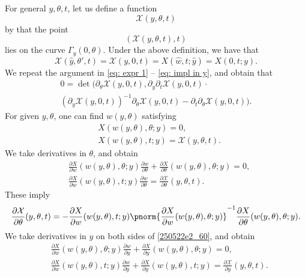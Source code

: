 \documentclass{article}
\numberwithin{equation}{section}
\theoremstyle{plain}
\begin{document}
For general $y, \theta, t$, let us define a function 
\begin{equation}
\mathcal{X}(y, \theta, t)
\end{equation}
by that the point
\begin{equation}
(\mathcal{X}(y, \theta, t), t)
\end{equation}
lies on the curve $\Gamma_y(0, \theta)$. 
 Under the above definition, we have that 
\begin{equation}
\mathcal{X}(\hat{y}, \theta', t)= \mathcal{X}(y, 0, t)= X(
\hat{w}, t; \hat{y}
)=X(0, t; y).
\end{equation}
We repeat the argument in \eqref{eq: expr 1} -- \eqref{eq: impl in y}, and obtain that 
\begin{multline}\label{250522e2_59tt}
    0= 
    \det(\partial_\theta \mathcal{X}(y, 0, t), \partial_y \partial_t \mathcal{X}(y, 0, t) \cdot\\
     (\partial_y \mathcal{X}(y, 0, t))^{-1} \partial_\theta \mathcal{X}(y, 0, t) - \partial_t \partial_\theta \mathcal{X}(y, 0, t)).
\end{multline}
For given $y, \theta$, one can find $w(y, \theta)$ satisfying 
\begin{align}\label{250522e2_60}
& X(w(y, \theta), \theta; y)=0,\\
& X(w(y, \theta), t; y)= \mathcal{X}(y, \theta, t).
\end{align}
We take derivatives in $\theta$, and obtain 
\begin{align}\label{250522e2_62}
& \frac{\partial X}{\partial w}(w(y, \theta), \theta; y)
\frac{\partial w}{\partial \theta}+ \frac{\partial X}{\partial \theta}(w(y, \theta), \theta; y)
=0,\\
& \frac{\partial X}{\partial w}(w(y, \theta), t; y)\frac{\partial w}{\partial \theta}= \frac{\partial \mathcal{X}}{\partial \theta}(y, \theta, t).
\end{align}
These imply 
\begin{equation}\label{250522e2_64}
\frac{\partial \mathcal{X}}{\partial \theta}(y, \theta, t)=
-
\frac{\partial X}{\partial w}(w(y, \theta), t; y)\pnorm{
\frac{\partial X}{\partial w}(w(y, \theta), \theta; y)
}^{-1} \frac{\partial X}{\partial \theta}(w(y, \theta), \theta; y).
\end{equation}
We take derivatives in $y$ on both sides of \eqref{250522e2_60}, and obtain 
\begin{align}\label{250522e2_65}
& \frac{\partial X}{\partial w}(w(y, \theta), \theta; y)
\frac{\partial w}{\partial y}+ \frac{\partial X}{\partial y}(w(y, \theta), \theta; y)
=0,\\
& \frac{\partial X}{\partial w}(w(y, \theta), t; y)\frac{\partial w}{\partial y}
+
\frac{\partial X}{\partial y}(w(y, \theta), t; y)
= \frac{\partial \mathcal{X}}{\partial y}(y, \theta, t).
\end{align}
\end{document}
